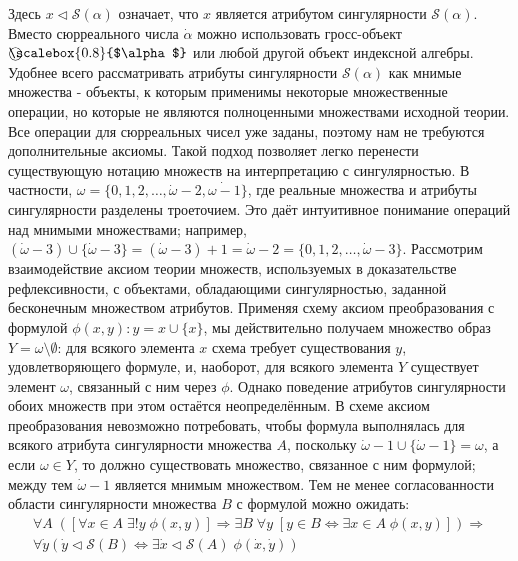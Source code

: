 \documentclass[12pt]{article}
\begin{document}
Здесь $x \triangleleft \mathcal{S}(\alpha)$ означает, что $x$ является атрибутом сингулярности $\mathcal{S}(\alpha)$. Вместо сюрреального числа $\dot{\alpha}$ можно использовать гросс-объект $\raisebox{.5pt}{\textcircled{\scalebox{0.8}{$\alpha$}}}$ или любой другой объект индексной алгебры. Удобнее всего рассматривать атрибуты сингулярности $\mathcal{S}(\alpha)$ как мнимые множества - объекты, к которым применимы некоторые множественные операции, но которые не являются полноценными множествами исходной теории. Все операции для сюрреальных чисел уже заданы, поэтому нам не требуются дополнительные аксиомы. Такой подход позволяет легко перенести существующую нотацию множеств на интерпретацию с сингулярностью. В частности, $\omega = \{0, 1, 2, \dots, \dot{\omega} - 2, \dot{\omega - 1}\}$, где реальные множества и атрибуты сингулярности разделены троеточием. Это даёт интуитивное понимание операций над мнимыми множествами; например, $(\dot{\omega} - 3) \cup \{ \dot{\omega} - 3 \} = (\dot{\omega} - 3) + 1 = \dot{\omega} - 2 = \{0, 1, 2, \dots, \dot{\omega} - 3 \}$. Рассмотрим взаимодействие аксиом теории множеств, используемых в доказательстве рефлексивности, с объектами, обладающими сингулярностью, заданной бесконечным множеством атрибутов. Применяя схему аксиом преобразования с формулой $\phi(x, y) : y = x \cup \{ x \}$, мы действительно получаем множество образ $Y = \omega \setminus \emptyset$: для всякого элемента $x$ схема требует существования $y$, удовлетворяющего формуле, и, наоборот, для всякого элемента $Y$ существует элемент $\omega$, связанный с ним через $\phi$. Однако поведение атрибутов сингулярности обоих множеств при этом остаётся неопределённым. В схеме аксиом преобразования невозможно потребовать, чтобы формула выполнялась для всякого атрибута сингулярности множества $A$, поскольку $\dot{\omega} - 1 \cup \{\dot{\omega} - 1\} = \omega$, а если $\omega \in Y$, то должно существовать множество, связанное с ним формулой; между тем $\dot{\omega} - 1$ является мнимым множеством. Тем не менее согласованности области сингулярности множества $B$ с формулой можно ожидать:
\begin{equation}
\begin{gathered}
\forall A \; ( [ \forall x \in A \; \exists! y \; \phi(x, y) ] \Rightarrow \exists B \; \forall y \; [ y \in B \Leftrightarrow \exists x \in A \; \phi(x, y) ]) \Rightarrow \\
 \forall \dot{y} (\dot{y} \triangleleft \mathcal{S}(B) \Leftrightarrow \exists \dot{x} \triangleleft \mathcal{S}(A) \; \phi(\dot{x}, \dot{y}))
\label{axiom:singularity-replacement}
\end{gathered}
\end{equation}
\end{document}
